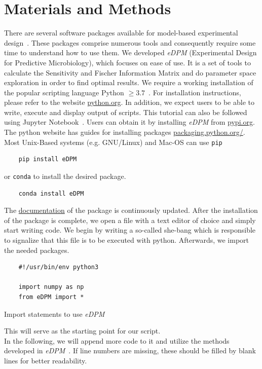 \documentclass[graybox]{svmult}
\begin{document}
\section*{Materials and Methods}
There are several software packages available for model-based experimental design~\cite{balsa-canto_amigo2_2016, zhang_optimal_2018, busetto_near-optimal_2013}.
These packages comprise numerous tools and consequently require some time to understand how to use them.
We developed {\it eDPM} (Experimental Design for Predictive Microbiology), which focuses on ease of use.
It is a set of tools to calculate the Sensitivity and Fischer Information Matrix and do parameter space exploration in order to find optimal results.
We require a working installation of the popular scripting language Python $\geq3.7$~\cite{rossumPythonLanguageReference2010}.
For installation instructions, please refer to the website \href{https://www.python.org/downloads/}{python.org}.
In addition, we expect users to be able to write, execute and display output of scripts.
This tutorial can also be followed using Jupyter Notebook~\cite{jupyterteamJupyterNotebook}.
%
Users can obtain it by installing {\it eDPM} from \href{https://pypi.org/project/edpm/0.0.1/}{pypi.org}.
The python website has guides for installing packages \href{https://packaging.python.org/en/latest/tutorials/installing-packages/}{packaging.python.org/}.
Most Unix-Based systems (e.g. GNU/Linux) and Mac-OS can use \texttt{pip}
\begin{verbatim}
    pip install eDPM
\end{verbatim}
or \texttt{conda} to install the desired package.
\begin{verbatim}
    conda install eDPM
\end{verbatim}
The \href{https://spatial-systems-biology-freiburg.github.io/eDPM/}{documentation} of the package is continuously updated.
After the installation of the package is complete, we open a file with a text editor of choice and simply start writing code.
We begin by writing a so-called she-bang which is responsible to signalize that this file is to be executed with python.
Afterwards, we import the needed packages.
\begin{code}[h]
    \begin{verbatim}
    #!/usr/bin/env python3

    import numpy as np
    from eDPM import *
    \end{verbatim}
    \caption{Import statements to use {\it eDPM}}
    \label{code:import_statements}
\end{code}
This will serve as the starting point for our script.\\
In the following, we will append more code to it and utilize the methods developed in {\it eDPM}~\cite{edpm2023}.
If line numbers are missing, these should be filled by blank lines for better readability.
%
%
\end{document}
